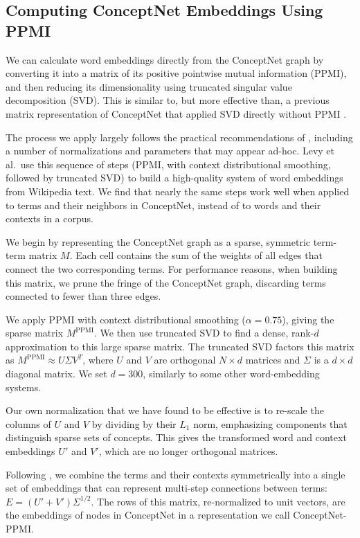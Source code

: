 \documentclass[letterpaper]{article}
\begin{document}
\subsection{Computing ConceptNet Embeddings Using PPMI}


We can calculate word embeddings directly from the ConceptNet graph by converting
it into a matrix of its positive pointwise mutual information (PPMI), and then
reducing its dimensionality using truncated singular value decomposition (SVD).
This is similar to, but more effective than, a previous matrix representation of
ConceptNet that applied SVD directly without PPMI \cite{speer2008analogyspace}.

The process we apply largely follows the practical recommendations of
\citeauthor{levy2015embeddings} , including a
number of normalizations and parameters that may appear ad-hoc. Levy et al.~use
this sequence of steps (PPMI, with context distributional smoothing, followed
by truncated SVD) to build a high-quality system of word embeddings from
Wikipedia text. We find that nearly the same steps work well when applied to
terms and their neighbors in ConceptNet, instead of to words and their contexts
in a corpus.

We begin by representing the ConceptNet graph as a sparse, symmetric term-term matrix $M$.
Each cell contains the sum of the weights of all edges that connect the two
corresponding terms. For performance reasons, when building this matrix, we
prune the fringe of the ConceptNet graph, discarding terms connected to fewer
than three edges.

We apply PPMI with context distributional smoothing ($\alpha=0.75$), giving the
sparse matrix $M^\mathrm{PPMI}$. We then use truncated SVD to find a dense, rank-$d$
approximation to this large sparse matrix. The truncated SVD factors this
matrix as $M^\mathrm{PPMI} \approx U \Sigma V^T$, where $U$ and $V$ are orthogonal $N
\times d$ matrices and $\Sigma$ is a $d \times d$ diagonal matrix. We set $d =
300$, similarly to some other word-embedding systems.

Our own normalization that we have found to be effective is to re-scale the
columns of $U$ and $V$ by dividing by their $L_1$ norm, emphasizing components
that distinguish sparse sets of concepts. This gives the transformed word and
context embeddings $U'$ and $V'$, which are no longer orthogonal matrices.

Following \citeauthor{levy2015embeddings}, we combine the terms and their
contexts symmetrically into a single set of embeddings that can represent
multi-step connections between terms: $E = (U' + V')\Sigma^{1/2}$. The rows of
this matrix, re-normalized to unit vectors, are the embeddings of nodes in
ConceptNet in a representation we call ConceptNet-PPMI.
\end{document}
